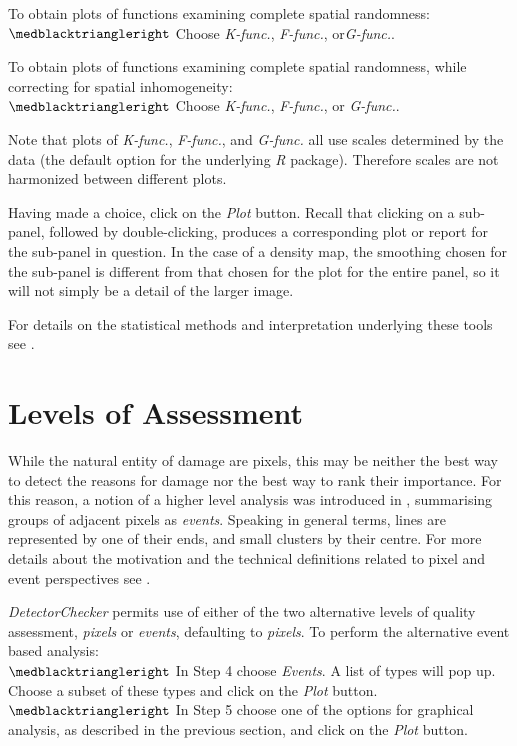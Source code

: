\documentclass[11pt,a4paper]{article}
\newcommand{\DetectorChecker}{\emph{DetectorChecker}\xspace}
\newcommand{\Rsoftware}{\emph{R}\xspace}
\begin{document}
To obtain plots of functions examining complete spatial randomness:\\ 
$\medblacktriangleright$ Choose \emph{K-func.}, 
\emph{F-func.}, or\emph{G-func.}.

To obtain plots of functions examining complete spatial randomness, while correcting for spatial inhomogeneity:\\ 
$\medblacktriangleright$ Choose \emph{K-func.}, 
\emph{F-func.}, or \emph{G-func.}.

Note that plots of \emph{K-func.}, 
\emph{F-func.}, and \emph{G-func.}
all use scales determined by the data
(the default option for the underlying \Rsoftware package).
Therefore scales are not harmonized between 
different plots.


Having made a choice, click on the \emph{Plot} button.
Recall that clicking on a sub-panel, followed by double-clicking,
produces a corresponding plot or report 
for the sub-panel in question.
In the case of a density map, the smoothing 
chosen for the sub-panel is different
from that chosen for the plot for the entire panel,
so it will not simply be a detail of the larger image.

For details on the statistical methods and interpretation underlying these tools see \cite{brettschneider2017crism}.


\section{Levels of Assessment}\label{levels}

While the natural entity of damage are pixels, this may
be neither the best way
to detect the reasons for damage nor 
the best way to rank their importance. For this reason,
a notion of a higher level analysis was introduced in
\cite{brettschneider2017crism}, summarising 
groups of adjacent pixels as \emph{events}. 
Speaking in general terms, lines are represented by one of their ends, and small clusters by their centre. For more details about the motivation and the technical definitions related to pixel and event perspectives see \cite{brettschneider2017crism}.

\DetectorChecker permits use of either of the two alternative levels of quality assessment, \emph{pixels}
or \emph{events}, defaulting to \emph{pixels}.
To perform the alternative event based analysis:\\
$\medblacktriangleright$ In Step 4 choose \emph{Events}. A list of types will pop up. Choose a subset of these types and click on the \emph{Plot} button.\\
$\medblacktriangleright$ In Step 5 choose one of the options for graphical analysis, as described in the previous section, and 
click on the \emph{Plot} button.
\end{document}
